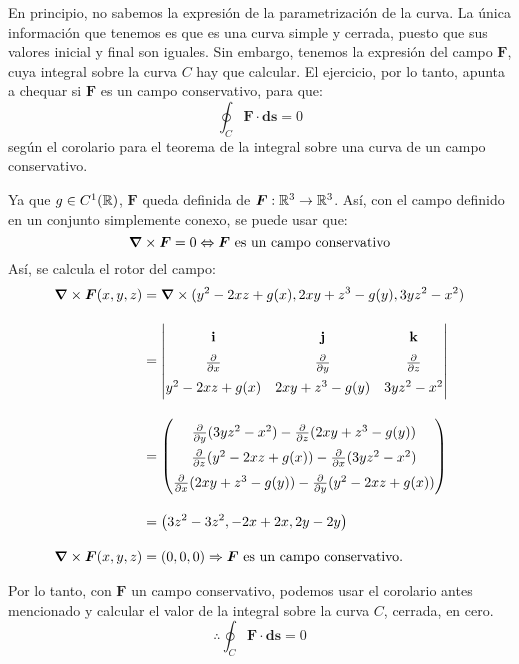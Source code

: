\begin{solution}
    En principio, no sabemos la expresión de la parametrización de la curva. La única información que tenemos es que es una curva simple y cerrada, puesto que sus valores inicial y final son iguales.
    Sin embargo, tenemos la expresión del campo $\boldsymbol{F}$, cuya integral sobre la curva $C$ hay que calcular. El ejercicio, por lo tanto, apunta a chequar si $\boldsymbol{F}$ es un campo conservativo, para que:
    \begin{equation*}
        \oint_{C}\boldsymbol{F}\cdot\boldsymbol{ds}=0
    \end{equation*}
    según el corolario para el teorema de la integral sobre una curva de un campo conservativo.

    Ya que $g \in C^1(\mathbb{R})$, $\boldsymbol{F}$ queda definida de $\boldsymbol{F}:\mathbb{R}^3\rightarrow\mathbb{R}^3$. Así, con el campo definido en un conjunto simplemente conexo, se puede usar que:
    \begin{equation*}
        \grad \times \boldsymbol{F} = 0 \Leftrightarrow \boldsymbol{F} \text{ es un campo conservativo}
    \end{equation*}
    Así, se calcula el rotor del campo:
    \begin{align*}
        \grad \times \boldsymbol{F}(x,y,z) &= \grad \times (y^2-2xz+g(x),2xy+z^3-g(y),3yz^2-x^2)\\[10pt]
        &=  \renewcommand{\arraystretch}{1.5} \begin{vmatrix}
                \mathbf{i} & \mathbf{j} & \mathbf{k} \\
                \partialx & \partialy & \partialz \\
                y^2-2xz+g(x) & 2xy+z^3-g(y) & 3yz^2-x^2
            \end{vmatrix} \\[10pt]
    &= \renewcommand{\arraystretch}{1.5} \begin{pmatrix}
        \partialy(3yz^2-x^2) - \partialz(2xy+z^3-g(y)) \\
        \partialz(y^2-2xz+g(x)) - \partialx(3yz^2-x^2) \\
        \partialx(2xy+z^3-g(y)) - \partialy(y^2-2xz+g(x))
        \end{pmatrix}\\[10pt]
    &= \left(3z^2-3z^2,-2x+2x,2y-2y\right)\\[10pt]
    \grad \times \boldsymbol{F}(x,y,z) &= (0,0,0) \Rightarrow \boldsymbol{F} \text{ es un campo conservativo.}
    \end{align*}

    Por lo tanto, con $\boldsymbol{F}$ un campo conservativo, podemos usar el corolario antes mencionado y calcular el valor de la integral sobre la curva $C$, cerrada, en cero.
    \begin{equation*}
       \therefore \oint_{C}\boldsymbol{F}\cdot\boldsymbol{ds}=0
    \end{equation*}
\end{solution}

